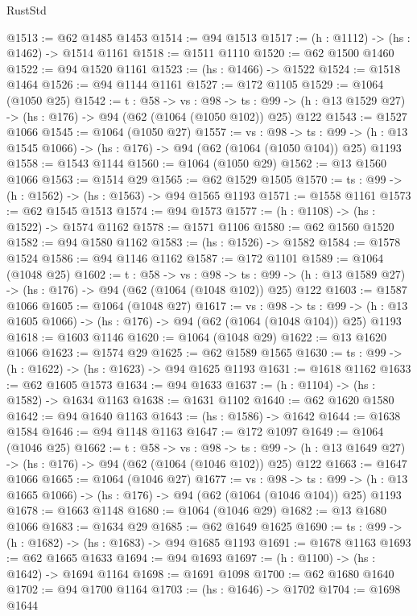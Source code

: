 \begin{lexlean}{RustStd}
\begin{coremodule}
{\begin{coremodule}
{{{{{{{{{@1513 := @62 @1485 @1453
@1514 := @94 @1513
@1517 := (h : @1112) -> (hs : @1462) -> @1514 @1161
@1518 := @1511 @1110
@1520 := @62 @1500 @1460
@1522 := @94 @1520 @1161
@1523 := (hs : @1466) -> @1522
@1524 := @1518 @1464
@1526 := @94 @1144 @1161
@1527 := @172 @1105
@1529 := @1064 (@1050 @25)
@1542 := {t : @58} ->
  {vs : @98} ->
  {ts : @99} -> (h : @13 @1529 @27) -> (hs : @176) -> @94 (@62 (@1064 (@1050 @102)) @25) @122
@1543 := @1527 @1066
@1545 := @1064 (@1050 @27)
@1557 := {vs : @98} ->
  {ts : @99} -> (h : @13 @1545 @1066) -> (hs : @176) -> @94 (@62 (@1064 (@1050 @104)) @25) @1193
@1558 := @1543 @1144
@1560 := @1064 (@1050 @29)
@1562 := @13 @1560 @1066
@1563 := @1514 @29
@1565 := @62 @1529 @1505
@1570 := {ts : @99} -> (h : @1562) -> (hs : @1563) -> @94 @1565 @1193
@1571 := @1558 @1161
@1573 := @62 @1545 @1513
@1574 := @94 @1573
@1577 := (h : @1108) -> (hs : @1522) -> @1574 @1162
@1578 := @1571 @1106
@1580 := @62 @1560 @1520
@1582 := @94 @1580 @1162
@1583 := (hs : @1526) -> @1582
@1584 := @1578 @1524
@1586 := @94 @1146 @1162
@1587 := @172 @1101
@1589 := @1064 (@1048 @25)
@1602 := {t : @58} ->
  {vs : @98} ->
  {ts : @99} -> (h : @13 @1589 @27) -> (hs : @176) -> @94 (@62 (@1064 (@1048 @102)) @25) @122
@1603 := @1587 @1066
@1605 := @1064 (@1048 @27)
@1617 := {vs : @98} ->
  {ts : @99} -> (h : @13 @1605 @1066) -> (hs : @176) -> @94 (@62 (@1064 (@1048 @104)) @25) @1193
@1618 := @1603 @1146
@1620 := @1064 (@1048 @29)
@1622 := @13 @1620 @1066
@1623 := @1574 @29
@1625 := @62 @1589 @1565
@1630 := {ts : @99} -> (h : @1622) -> (hs : @1623) -> @94 @1625 @1193
@1631 := @1618 @1162
@1633 := @62 @1605 @1573
@1634 := @94 @1633
@1637 := (h : @1104) -> (hs : @1582) -> @1634 @1163
@1638 := @1631 @1102
@1640 := @62 @1620 @1580
@1642 := @94 @1640 @1163
@1643 := (hs : @1586) -> @1642
@1644 := @1638 @1584
@1646 := @94 @1148 @1163
@1647 := @172 @1097
@1649 := @1064 (@1046 @25)
@1662 := {t : @58} ->
  {vs : @98} ->
  {ts : @99} -> (h : @13 @1649 @27) -> (hs : @176) -> @94 (@62 (@1064 (@1046 @102)) @25) @122
@1663 := @1647 @1066
@1665 := @1064 (@1046 @27)
@1677 := {vs : @98} ->
  {ts : @99} -> (h : @13 @1665 @1066) -> (hs : @176) -> @94 (@62 (@1064 (@1046 @104)) @25) @1193
@1678 := @1663 @1148
@1680 := @1064 (@1046 @29)
@1682 := @13 @1680 @1066
@1683 := @1634 @29
@1685 := @62 @1649 @1625
@1690 := {ts : @99} -> (h : @1682) -> (hs : @1683) -> @94 @1685 @1193
@1691 := @1678 @1163
@1693 := @62 @1665 @1633
@1694 := @94 @1693
@1697 := (h : @1100) -> (hs : @1642) -> @1694 @1164
@1698 := @1691 @1098
@1700 := @62 @1680 @1640
@1702 := @94 @1700 @1164
@1703 := (hs : @1646) -> @1702
@1704 := @1698 @1644
}}}}}}}}}
\end{coremodule}}
\end{coremodule}
\end{lexlean}

